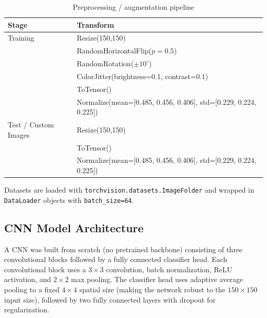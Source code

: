 \documentclass[11pt,a4paper]{article}
\begin{document}
\begin{table}[H]
\centering
\caption{Preprocessing / augmentation pipeline}
\label{tab:transforms}
\begin{tabular}{ll}
\toprule
\textbf{Stage} & \textbf{Transform} \\
\midrule
Training & Resize(150,150) \\
 & RandomHorizontalFlip($p=0.5$) \\
 & RandomRotation($\pm10^{\circ}$) \\
 & ColorJitter(brightness=0.1, contrast=0.1) \\
 & ToTensor() \\
 & Normalize(mean=[0.485, 0.456, 0.406], std=[0.229, 0.224, 0.225]) \\
\midrule
Test / Custom Images & Resize(150,150) \\
 & ToTensor() \\
 & Normalize(mean=[0.485, 0.456, 0.406], std=[0.229, 0.224, 0.225]) \\
\bottomrule
\end{tabular}
\end{table}

Datasets are loaded with \texttt{torchvision.datasets.ImageFolder} and wrapped in \texttt{DataLoader} objects with \texttt{batch\_size=64}.

\subsection{CNN Model Architecture}
A CNN was built from scratch (no pretrained backbone) consisting of three convolutional blocks followed by a fully connected classifier head. Each convolutional block uses a $3\times3$ convolution, batch normalization, ReLU activation, and $2\times2$ max pooling. The classifier head uses adaptive average pooling to a fixed $4\times4$ spatial size (making the network robust to the $150\times150$ input size), followed by two fully connected layers with dropout for regularization.

\begin{table}[H]
\centering
\caption{CNN architecture summary}
\label{tab:architecture}
\end{table}
\end{document}
